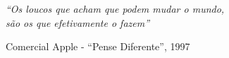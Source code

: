 \documentclass[oldfontcommands,12pt,openright,twoside,a4paper,brazil]{abntex2}
\begin{document}








\begin{epigrafe}
    \vspace*{\fill}
	\begin{flushright}
		\textit{``Os loucos que acham que podem mudar o mundo,\\
						são os que efetivamente o fazem''}
						
		Comercial Apple - ``Pense Diferente'', 1997
	\end{flushright}

\end{epigrafe}
\end{document}
